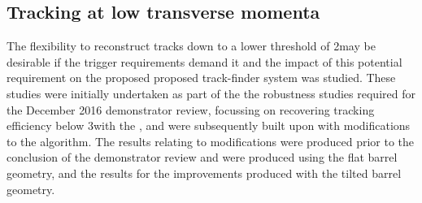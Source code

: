%

%

\subsection{Tracking at low transverse momenta}\label{subsec:Tmtt2GeV}
The flexibility to reconstruct tracks down to a lower \pT threshold of 2\GeV may be desirable if the trigger requirements demand it and the impact of this potential requirement on the proposed proposed track-finder system was studied.
These studies were initially undertaken as part of the the robustness studies required for the December 2016 demonstrator review, focussing on recovering tracking efficiency below 3\GeV with the \HT, and were subsequently built upon with modifications to the \KF algorithm. 
The results relating to \HT modifications were produced prior to the conclusion of the demonstrator review and were produced using the flat barrel geometry, and the results for the \KF improvements produced with the tilted barrel geometry.

